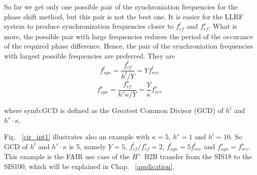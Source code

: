 So far we get only one possible pair of the synchroniation frequencies for the phase shift method, but this pair is not the best one. It is easier for the LLRF system to produce synchronization frequencies closer to $f_{\mathit{rf}}^{l}$ and $f_{\mathit{rf}}^{s}$. What is more, the possible pair with large frequencies reduces the period of the occurance of the required phase difference. Hence, the pair of the synchroniation frequencies with largest possible frequencies are preferred. They are
\begin{equation}
f_{\mathit{syn}}^{l}=\frac{f_{\mathit{rf}}^{l}}{h^{l}/Y}=Yf_{\mathit{rev}}^{l} \label{synch_freq1}
\end{equation}
\begin{equation}
f_{\mathit{syn}}^{s}=\frac{f_{\mathit{rf}}^{s}}{h^{s}\kappa/Y}=\frac{Y}{\kappa}f_{\mathit{rev}}^{s} \label{synch_freq2}
\end{equation}

where \gls{symb:GCD} is defined as the Greatest Common Divisor (\gls{GCD}) of $h^l$ and $h^s \cdot \kappa$.


Fig. ~\ref{cir_int1} illustrates also an example with $\kappa=5$, $h^s=1$ and $h^l=10$. So GCD of $h^l$ and $h^s \cdot \kappa$ is 5, namely $Y=5$, $f_{\mathit{rf}}^{l}/f_{\mathit{rf}}^{s}=2$, $f_{\mathit{syn}}^{l}=5f_{\mathit{rev}}^{l}$ and $f_{\mathit{syn}}^{s}=f_{\mathit{rev}}^{s}$. This example is the FAIR use case of the $H^{+}$ B2B transfer from the SIS18 to the SIS100, which will be explained in Chap. ~\ref{application}.


